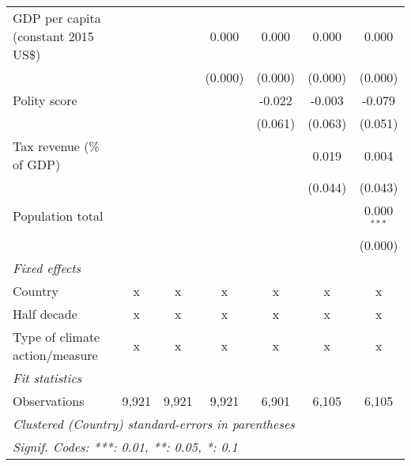 \begin{tabular}{lcccccc}
   GDP per capita (constant 2015 US\$)                                                        &                &                & 0.000          & 0.000          & 0.000          & 0.000\\   
                                                                                              &                &                & (0.000)        & (0.000)        & (0.000)        & (0.000)\\   
   Polity score                                                                               &                &                &                & -0.022         & -0.003         & -0.079\\   
                                                                                              &                &                &                & (0.061)        & (0.063)        & (0.051)\\   
   Tax revenue (\% of GDP)                                                                    &                &                &                &                & 0.019          & 0.004\\   
                                                                                              &                &                &                &                & (0.044)        & (0.043)\\   
   Population total                                                                           &                &                &                &                &                & 0.000$^{***}$\\   
                                                                                              &                &                &                &                &                & (0.000)\\   
   \emph{Fixed effects}\\
   Country                                                                                    & x              & x              & x              & x              & x              & x\\  
   Half decade                                                                                & x              & x              & x              & x              & x              & x\\  
   Type of climate action/measure                                                             & x              & x              & x              & x              & x              & x\\  
   \midrule \emph{Fit statistics}\\
   Observations                                                                               & 9,921          & 9,921          & 9,921          & 6,901          & 6,105          & 6,105\\  
   \midrule
   \multicolumn{7}{l}{\emph{Clustered (Country) standard-errors in parentheses}}\\
   \multicolumn{7}{l}{\emph{Signif. Codes: ***: 0.01, **: 0.05, *: 0.1}}\\
\end{tabular}
\par\endgroup


